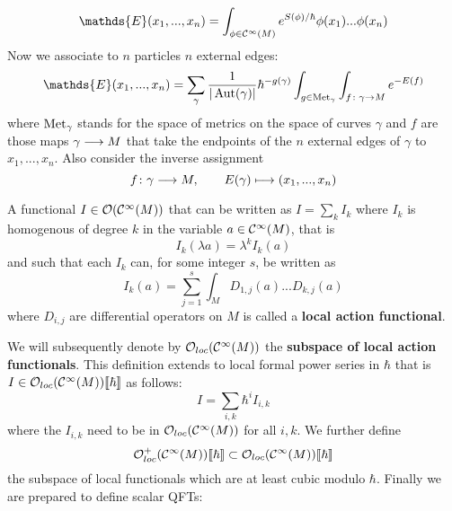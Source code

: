 \begin{equation}
  \mathds{E}(x_1, ..., x_n) = \int_{\phi \in \Ci(M)} e^{S(\phi)/\hbar} \phi(x_1) ... \phi(x_n)
\end{equation}
Now we associate to $n$ particles $n$ external edges:
\begin{equation}
  \mathds{E}(x_1, ..., x_n) = \sum_\gamma \frac{1}{|\Aut(\gamma)|} \hbar^{-g(\gamma)} \int_{g \in \Mett_\gamma} \int_{f\colon \gamma \ra M} e^{-E(f)}
\end{equation}
where $\operatorname{Met}_\gamma$ stands for the space of metrics on the space of curves $\gamma$ and $f$ are those maps $\gamma \longrightarrow M$ that take the endpoints of the $n$ external edges of $\gamma$ to $x_1,...,x_n$. Also consider the inverse assignment
\begin{equation}
  f \colon \gamma \longrightarrow M, \quad \quad E(\gamma) \longmapsto (x_1,...,x_n)
\end{equation}
\begin{definition}
  A functional $I \in \mathcal{O}(\mathcal{C}^{\infty}(M))$ that can be written as $I = \sum_k I_k$ where $I_k$ is homogenous of degree $k$ in the variable $a \in \mathcal{C}^{\infty}(M)$, that is
  \begin{equation}I_k(\lambda a) = \lambda^k I_k(a)\end{equation}
  and such that each $I_k$ can, for some integer $s$, be written as
  \begin{equation}
    I_k (a) = \sum_{j=1}^{s} \int_M D_{1,j} (a) ... D_{k,j} (a)
  \end{equation}
  where $D_{i,j}$ are differential operators on $M$ is called a \textbf{local action functional}.
\end{definition}
We will subsequently denote by $\mathcal{O}_{loc}(\mathcal{C}^{\infty}(M))$ the \textbf{subspace of local action functionals}. This definition extends to local formal power series in $\hbar$ that is $I \in \mathcal{O}_{loc}(\mathcal{C}^{\infty}(M))\llbracket \hbar \rrbracket$ as follows:
\begin{equation} I = \sum_{i,k} \hbar^i I_{i,k}\end{equation}
where the $I_{i,k}$ need to be in $\mathcal{O}_{loc}(\mathcal{C}^{\infty}(M))$ for all $i,k$. We further define
\begin{equation} \mathcal{O}^+_{loc}(\mathcal{C}^{\infty}(M))\llbracket \hbar \rrbracket \subset \mathcal{O}_{loc}(\mathcal{C}^{\infty}(M))\llbracket \hbar \rrbracket\end{equation}
the subspace of local functionals which are at least cubic modulo $\hbar$. Finally we are prepared to define scalar QFTs:


